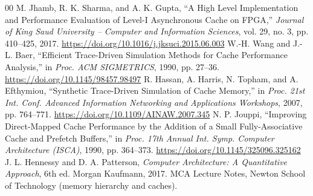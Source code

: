 \documentclass[conference]{IEEEtran}
\begin{document}
\begin{thebibliography}{00}
 M. Jhamb, R. K. Sharma, and A. K. Gupta, ``A High Level Implementation and Performance Evaluation of Level-I Asynchronous Cache on FPGA,'' \textit{Journal of King Saud University -- Computer and Information Sciences}, vol. 29, no. 3, pp. 410--425, 2017. \url{https://doi.org/10.1016/j.jksuci.2015.06.003}
 W.-H. Wang and J.-L. Baer, ``Efficient Trace-Driven Simulation Methods for Cache Performance Analysis,'' in \textit{Proc. ACM SIGMETRICS}, 1990, pp. 27--36. \url{https://doi.org/10.1145/98457.98497}
 R. Hassan, A. Harris, N. Topham, and A. Efthymiou, ``Synthetic Trace-Driven Simulation of Cache Memory,'' in \textit{Proc. 21st Int. Conf. Advanced Information Networking and Applications Workshops}, 2007, pp. 764--771. \url{https://doi.org/10.1109/AINAW.2007.345}
 N. P. Jouppi, ``Improving Direct-Mapped Cache Performance by the Addition of a Small Fully-Associative Cache and Prefetch Buffers,'' in \textit{Proc. 17th Annual Int. Symp. Computer Architecture (ISCA)}, 1990, pp. 364--373. \url{https://doi.org/10.1145/325096.325162}
 J. L. Hennessy and D. A. Patterson, \textit{Computer Architecture: A Quantitative Approach}, 6th ed. Morgan Kaufmann, 2017.
 MCA Lecture Notes, Newton School of Technology (memory hierarchy and caches).
\end{thebibliography}
\end{document}

